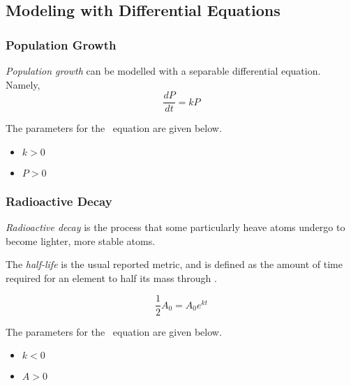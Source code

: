\subsection{Modeling with Differential Equations} \label{subsec:Modeling with DEs}
\subsubsection{Population Growth} \label{subsubsec:Population Growth}
\begin{definition}
  \emph{Population growth} can be modelled with a separable differential equation. Namely,
  \begin{equation} \label{eq:Population Growth}
    \frac{dP}{dt} = kP
  \end{equation}
  \begin{remark} \label{rmk:Population Growth Parameters}
    The parameters for the ~equation are given below.
    \begin{itemize}[noitemsep, nolistsep]
    \item $k>0$
    \item $P>0$
    \end{itemize}
  \end{remark}
\end{definition}
\subsubsection{Radioactive Decay} \label{subsubsec:Radioactive Decay}
\begin{definition} \label{def:Radioactive Decay}
  \emph{Radioactive decay} is the process that some particularly heave atoms undergo to become lighter, more stable atoms.
  \begin{definition} \label{subdef:Half-Life}
    The \emph{half-life} is the usual reported metric, and is defined as the amount of time required for an element to half its mass through .
  \end{definition}
  \begin{equation} \label{eq:Radioactive Decay}
    \frac{1}{2} A_{0} = A_{0} e^{kt}
  \end{equation}
  \begin{remark} \label{rmk:Radioactive Decay Parameters}
    The parameters for the ~equation are given below.
    \begin{itemize}[noitemsep, nolistsep]
    \item $k<0$
    \item $A>0$
    \end{itemize}
  \end{remark}
\end{definition}
